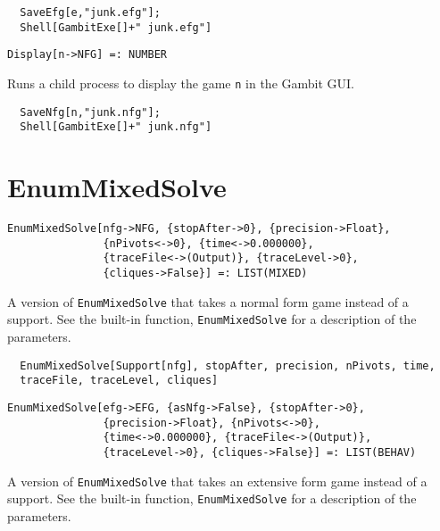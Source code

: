 \udfbody
\begin{verbatim}
  SaveEfg[e,"junk.efg"];
  Shell[GambitExe[]+" junk.efg"]
\end{verbatim} 

\newsignature

\begin{verbatim}
Display[n->NFG] =: NUMBER 
\end{verbatim}

\noindent
Runs a child process to display the game \verb+n+ in the Gambit GUI. 

\udfbody
\begin{verbatim}
  SaveNfg[n,"junk.nfg"];
  Shell[GambitExe[]+" junk.nfg"]
\end{verbatim} 


\section*{EnumMixedSolve}\label{ExtEnumMixedSolve}
\begin{verbatim}
EnumMixedSolve[nfg->NFG, {stopAfter->0}, {precision->Float}, 
               {nPivots<->0}, {time<->0.000000}, 
               {traceFile<->(Output)}, {traceLevel->0}, 
               {cliques->False}] =: LIST(MIXED) 
\end{verbatim}

\noindent
A version of \verb+EnumMixedSolve+ that takes a normal form game instead
of a support.  See the built-in function, \verb+EnumMixedSolve+ for a
description of the parameters.

\udfbody
\begin{verbatim}
  EnumMixedSolve[Support[nfg], stopAfter, precision, nPivots, time, 
  traceFile, traceLevel, cliques]
\end{verbatim} 

\newsignature

\begin{verbatim}
EnumMixedSolve[efg->EFG, {asNfg->False}, {stopAfter->0}, 
               {precision->Float}, {nPivots<->0}, 
               {time<->0.000000}, {traceFile<->(Output)}, 
               {traceLevel->0}, {cliques->False}] =: LIST(BEHAV) 
\end{verbatim}

\noindent
A version of \verb+EnumMixedSolve+ that takes an extensive form game instead
of a support.  See the built-in function, \verb+EnumMixedSolve+ for a
description of the parameters.

